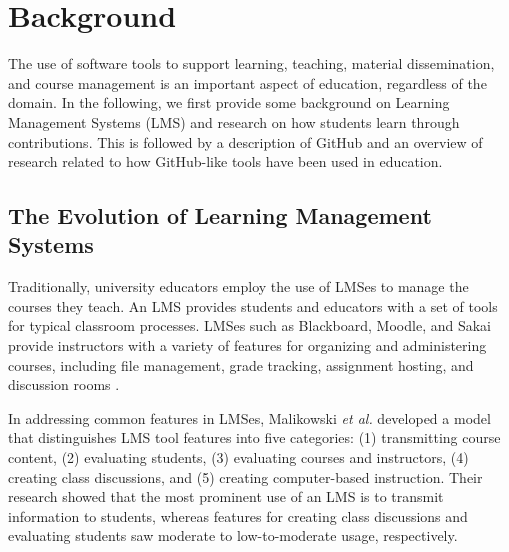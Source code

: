 



\section{Background}
The use of software tools to support learning, teaching, material dissemination, and course management is an important aspect of education, regardless of the domain. In the following, we first provide some background on Learning Management Systems (LMS) and research on how students learn through contributions. This is followed by a description of GitHub and an overview of research related to how GitHub-like tools have been used in education.

\subsection{The Evolution of Learning Management Systems}
Traditionally, university educators employ the use of LMSes to manage the courses they teach. An LMS provides students and educators with a set of tools for typical classroom processes. LMSes such as Blackboard, Moodle, and Sakai provide instructors with a variety of features for organizing and administering courses, including file management, grade tracking, assignment hosting, and discussion rooms \cite{kumar2011comparative}.

In addressing common features in LMSes, Malikowski \emph{et al.} \cite{malikowski2007model} developed a model that distinguishes LMS tool features into five categories: (1) transmitting course content, (2) evaluating students, (3) evaluating courses and instructors, (4) creating class discussions, and (5) creating computer-based instruction. Their research showed that the most prominent use of an LMS is to transmit information to students, whereas features for creating class discussions and evaluating students saw moderate to low-to-moderate usage, respectively.


